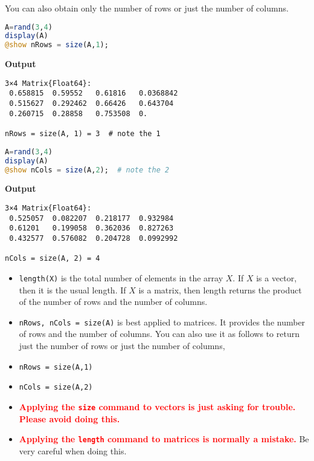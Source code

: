 You can also obtain only the number of rows or just the number of columns.

\begin{lstlisting}[language=Julia,style=mystyle]
A=rand(3,4)
display(A)
@show nRows = size(A,1);
\end{lstlisting}
\textbf{Output} 
\begin{verbatim}
3×4 Matrix{Float64}:
 0.658815  0.59552   0.61816   0.0368842
 0.515627  0.292462  0.66426   0.643704
 0.260715  0.28858   0.753508  0.
 
nRows = size(A, 1) = 3  # note the 1
\end{verbatim}

\begin{lstlisting}[language=Julia,style=mystyle]
A=rand(3,4)
display(A)
@show nCols = size(A,2);  # note the 2
\end{lstlisting}
\textbf{Output} 
\begin{verbatim}
3×4 Matrix{Float64}:
 0.525057  0.082207  0.218177  0.932984
 0.61201   0.199058  0.362036  0.827263
 0.432577  0.576082  0.204728  0.0992992
 
nCols = size(A, 2) = 4
\end{verbatim}

\vspace*{.2cm}

\begin{tcolorbox}[title = {\bf \large Length vs Size}]

\begin{itemize}
    \item \texttt{length(X)} is the total number of elements in the array $X$. If $X$ is a vector, then it is the usual length. If $X$ is a matrix, then length returns the product of the number of rows and the number of columns.
    
    \item \texttt{nRows, nCols = size(A)} is best applied to matrices. It provides the number of rows and the number of columns. You can also use it as follows to return just the number of rows or just the number of columns,
    
    \item \texttt{nRows = size(A,1)}
    
  \item \texttt{nCols = size(A,2)} 
  
  \item \textcolor{red}{\bf Applying the \texttt{size} command to vectors is just asking for trouble. Please avoid doing this.}

  \item \textcolor{red}{\bf Applying the \texttt{length} command to matrices is normally a mistake.} Be very careful when doing this. 
\end{itemize}


\end{tcolorbox}

